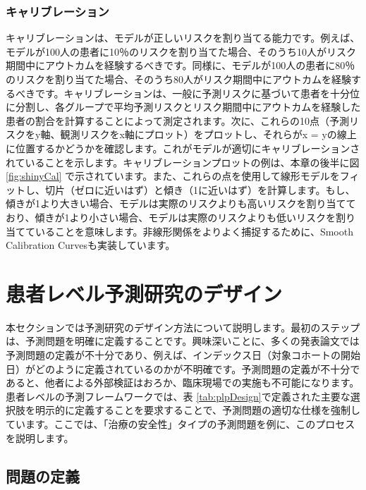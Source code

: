\documentclass[
  11pt]{book}
\theoremstyle{definition}
\theoremstyle{definition}
\theoremstyle{definition}
\theoremstyle{definition}
\theoremstyle{remark}
\begin{document}
\subsubsection*{キャリブレーション}\label{ux30adux30e3ux30eaux30d6ux30ecux30fcux30b7ux30e7ux30f3}

キャリブレーションは、モデルが正しいリスクを割り当てる能力です。例えば、モデルが100人の患者に10％のリスクを割り当てた場合、そのうち10人がリスク期間中にアウトカムを経験するべきです。同様に、モデルが100人の患者に80％のリスクを割り当てた場合、そのうち80人がリスク期間中にアウトカムを経験するべきです。キャリブレーションは、一般に予測リスクに基づいて患者を十分位に分割し、各グループで平均予測リスクとリスク期間中にアウトカムを経験した患者の割合を計算することによって測定されます。次に、これらの10点（予測リスクをy軸、観測リスクをx軸にプロット）をプロットし、それらがx = yの線上に位置するかどうかを確認します。これがモデルが適切にキャリブレーションされていることを示します。キャリブレーションプロットの例は、本章の後半に図 \ref{fig:shinyCal} で示されています。また、これらの点を使用して線形モデルをフィットし、切片（ゼロに近いはず）と傾き（1に近いはず）を計算します。もし、傾きが1より大きい場合、モデルは実際のリスクよりも高いリスクを割り当てており、傾きが1より小さい場合、モデルは実際のリスクよりも低いリスクを割り当てていることを意味します。非線形関係をよりよく捕捉するために、Smooth Calibration Curvesも実装しています。 

\section{患者レベル予測研究のデザイン}\label{ux60a3ux8005ux30ecux30d9ux30ebux4e88ux6e2cux7814ux7a76ux306eux30c7ux30b6ux30a4ux30f3}

本セクションでは予測研究のデザイン方法について説明します。最初のステップは、予測問題を明確に定義することです。興味深いことに、多くの発表論文では予測問題の定義が不十分であり、例えば、インデックス日（対象コホートの開始日）がどのように定義されているのかが不明確です。予測問題の定義が不十分であると、他者による外部検証はおろか、臨床現場での実施も不可能になります。患者レベルの予測フレームワークでは、表 \ref{tab:plpDesign}で定義された主要な選択肢を明示的に定義することを要求することで、予測問題の適切な仕様を強制しています。ここでは、「治療の安全性」タイプの予測問題を例に、このプロセスを説明します。

\subsection{問題の定義}\label{ux554fux984cux306eux5b9aux7fa9-2}
\end{document}
